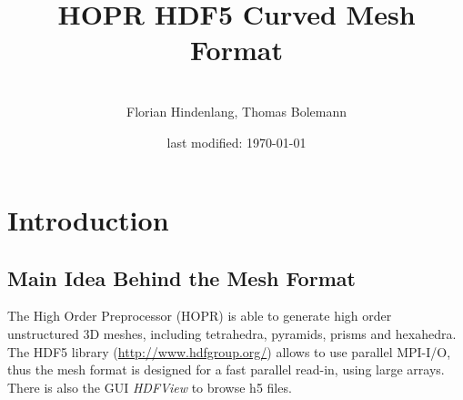 \documentclass[a4paper,headsepline]{scrreprt}
\renewcommand{\chaptermark}[1]{\markboth{#1}{}}
\renewcommand{\sectionmark}[1]{\markboth{\thesection\ #1}{}}
\begin{document}
\sloppy

\begin{titlepage}

\title{HOPR HDF5 Curved Mesh Format}

\author{\\
          Florian Hindenlang, Thomas Bolemann }


\date{last modified: \today}
\publishers{Institute for Aerodynamics and Gasdynamics, \\
            University of Stuttgart}



\end{titlepage}
\maketitle

\tableofcontents

\pagestyle{plain}
\renewcommand{\chaptermark}[1]{\markboth{#1}{}}
\renewcommand{\sectionmark}[1]{\markboth{\thesection\ #1}{}}
\lhead[\fancyplain{}{\sl\leftmark}]%
      {\fancyplain{}{\sl\leftmark}}
\rhead[\fancyplain{}{\sl\thepage}]%
      {\fancyplain{}{\sl\thepage}}
\cfoot{}




\newpage
\chapter{Introduction}

\section{Main Idea Behind the Mesh Format}

The High Order Preprocessor (HOPR) is able to generate high order unstructured 3D meshes, including tetrahedra, pyramids, prisms and hexahedra.  The HDF5 library (\url{http://www.hdfgroup.org/}) allows to use parallel MPI-I/O, thus the mesh format is designed for a fast parallel read-in, using large arrays. There is also the GUI \emph{HDFView} to browse h5 files.
\end{document}
